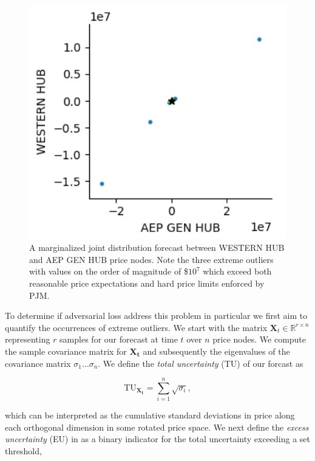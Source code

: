 \begin{figure}[htbp]
    \caption[Forecast joint distribution with extreme outliers]{
        A marginalized joint distribution forecast between WESTERN HUB and AEP GEN HUB price nodes.
        Note the three extreme outliers with values on the order of magnitude of \$$10^7$ which exceed both
        reasonable price expectations and hard price limits enforced by PJM.
    }
    \begin{center}
        \setlength{\fboxsep}{0pt}%
        \setlength{\fboxrule}{1pt}%
        \includegraphics[width=120mm]{figs/bad_samples}
    \end{center}
    \label{fig:badsamples}
\end{figure}

To determine if adversarial loss address this problem in particular we first aim to quantify the occurrences of extreme
outliers.
We start with the matrix $\mathbf{X}_t \in \mathbb{R}^{r \times n}$ representing $r$ samples for our forecast at time
$t$ over $n$ price nodes.
We compute the sample covariance matrix for $\mathbf{X_t}$ and subsequently the eigenvalues of the covariance matrix
${\sigma_1 \dots \sigma_n}$.
We define the \textit{total uncertainty} (TU) of our forcast as

\begin{equation*}
    \text{TU}_\mathbf{X_t} = \sum_{i=1}^{n} \sqrt{\sigma_i},
    \label{eq:total_uncertainty}
\end{equation*}

which can be interpreted as the cumulative standard deviations in price along each orthogonal dimension in some rotated
price space.
We next define the \textit{excess uncertainty} (EU) in as a binary indicator for the total uncertainty exceeding a set
threshold,

